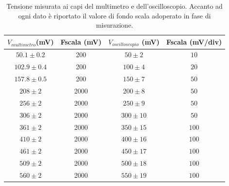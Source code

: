 \documentclass[a4paper,11pt]{article}
\begin{document}
\begin{table}[h!]
  \begin{center}
    \begin{tabular}{c|c|c|c}
      \textbf{$V_{multimetro}$(mV)} & \textbf{Fscala (mV)} & \textbf{$V_{oscilloscopio}$ (mV)} & \textbf{Fscala (mV/div)} \\
      \hline
      $50.1 \pm 0.2 $               & 200                  & $50 \pm 2 $                       & $10$                     \\
      $102.9 \pm 0.4 $              & 200                  & $100 \pm 4 $                      & $20$                     \\
      $157.8 \pm 0.5 $              & 200                  & $150 \pm 7 $                      & $50$                     \\
      $208 \pm 2 $                  & 2000                 & $200 \pm 8 $                      & $50$                     \\
      $256 \pm 2 $                  & 2000                 & $250 \pm 9 $                      & $50$                     \\
      $306 \pm 2 $                  & 2000                 & $300 \pm 10 $                     & $50$                     \\
      $361 \pm 2 $                  & 2000                 & $350 \pm 15 $                     & $100$                    \\
      $410 \pm 2$                   & 2000                 & $400 \pm 16 $                     & $100$                    \\
      $461 \pm 2$                   & 2000                 & $450 \pm 17 $                     & $100$                    \\
      $509 \pm 2$                   & 2000                 & $500 \pm 18 $                     & $100$                    \\
      $560 \pm 2$                   & 2000                 & $550 \pm 19 $                     & $100$                    \\
    \end{tabular}
    \caption{Tensione misurata ai capi del multimetro e dell'oscilloscopio. Accanto ad ogni dato è riportato il valore di fondo scala adoperato in fase di misurazione.}
  \end{center}
\end{table}
\end{document}

